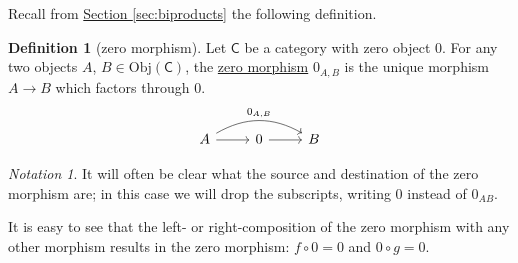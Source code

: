 \documentclass[a4paper,10pt]{scrreprt}
\newcommand{\defn}[1]{\ul{#1}}
\newcommand{\Obj}{\mathrm{Obj}}
\theoremstyle{definition}
\newtheorem{definition}{Definition}[section]
\theoremstyle{plain}
\theoremstyle{remark}
\newtheorem{notation}{Notation}[section]
\begin{document}
Recall from \hyperref[sec:biproducts]{Section \ref*{sec:biproducts}} the following definition.

\begin{definition}[zero morphism]
  \label{def:zeromorphism}
  Let $\mathsf{C}$ be a category with zero object $0$. For any two objects $A$, $B \in \Obj(\mathsf{C})$, the \defn{zero morphism} $0_{A,B}$ is the unique morphism $A \to B$ which factors through $0$.
  \begin{equation*}
    \begin{tikzcd}
      A
      \arrow[rr, bend left, "0_{A, B}"]
      \arrow[r]
      & 0
      \arrow[r]
      & B
    \end{tikzcd}
  \end{equation*}
\end{definition}

\begin{notation}
  It will often be clear what the source and destination of the zero morphism are; in this case we will drop the subscripts, writing $0$ instead of $0_{AB}$.
\end{notation}

It is easy to see that the left- or right-composition of the zero morphism with any other morphism results in the zero morphism: $f \circ 0 = 0$ and $0 \circ g = 0$.
\end{document}
